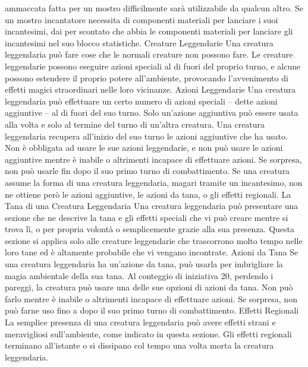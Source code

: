 \begin{multicols}{2}
ammaccata fatta per un mostro difficilmente sarà
utilizzabile da qualcun altro.
Se un mostro incantatore necessita di componenti
materiali per lanciare i suoi incantesimi, dai per
scontato che abbia le componenti materiali per lanciare
gli incantesimi nel suo blocco statistiche.
Creature Leggendarie
Una creatura leggendaria può fare cose che le normali
creature non possono fare. Le creature leggendarie
possono eseguire azioni speciali al di fuori del proprio
turno, e alcune possono estendere il proprio potere
all’ambiente, provocando l’avvenimento di effetti magici
straordinari nelle loro vicinanze.
Azioni Leggendarie
Una creatura leggendaria può effettuare un certo
numero di azioni speciali – dette azioni aggiuntive – al
di fuori del suo turno. Solo un’azione aggiuntiva può
essere usata alla volta e solo al termine del turno di
un’altra creatura. Una creatura leggendaria recupera
all’inizio del suo turno le azioni aggiuntive che ha
usato. Non è obbligata ad usare le sue azioni
leggendarie, e non può usare le azioni aggiuntive
mentre è inabile o altrimenti incapace di effettuare
azioni. Se sorpresa, non può usarle fin dopo il suo
primo turno di combattimento.
Se una creatura assume la forma di una creatura
leggendaria, magari tramite un incantesimo, non ne
ottiene però le azioni aggiuntive, le azioni da tana, o
gli effetti regionali.
La Tana di una Creatura
Leggendaria
Una creatura leggendaria può presentare una sezione
che ne descrive la tana e gli effetti speciali che vi può
creare mentre si trova lì, o per propria volontà o
semplicemente grazie alla sua presenza. Questa
sezione si applica solo alle creature leggendarie che
trascorrono molto tempo nelle loro tane ed è altamente
probabile che vi vengano incontrate.
Azioni da Tana
Se una creatura leggendaria ha un’azione da tana, può
usarla per imbrigliare la magia ambientale della sua
tana. Al conteggio di iniziativa 20, perdendo i pareggi,
la creatura può usare una delle sue opzioni di azioni da
tana. Non può farlo mentre è inabile o altrimenti
incapace di effettuare azioni. Se sorpresa, non può
farne uso fino a dopo il suo primo turno di
combattimento.
Effetti Regionali
La semplice presenza di una creatura leggendaria può
avere effetti strani e meravigliosi sull’ambiente, come
indicato in questa sezione. Gli effetti regionali
terminano all’istante o si dissipano col tempo una volta
morta la creatura leggendaria.


\end{multicols}
